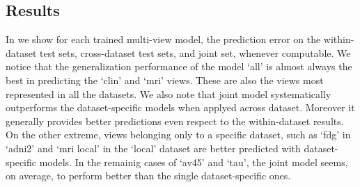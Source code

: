 \subsection{Results}
In  we show for each trained multi-view model, the prediction error on the within-dataset test sets, cross-dataset test sets, and joint set, whenever computable.
We notice that the generalization performance of the model `all' is almost always the best in predicting the `clin' and `mri' views.
These are also the views most represented in all the datasets.
We also note that joint model systematically outperforms the dataset-specific models when applyed across dataset.
Moreover it generally provides better predictions even respect to the within-dataset results.
On the other extreme, views belonging only to a specific dataset, such as `fdg' in `adni2' and `mri local' in the `local' dataset are better predicted with dataset-specific models.
In the remainig cases of `av45' and `tau', the joint model seems, on average, to perform better than the single dataset-specific ones.

